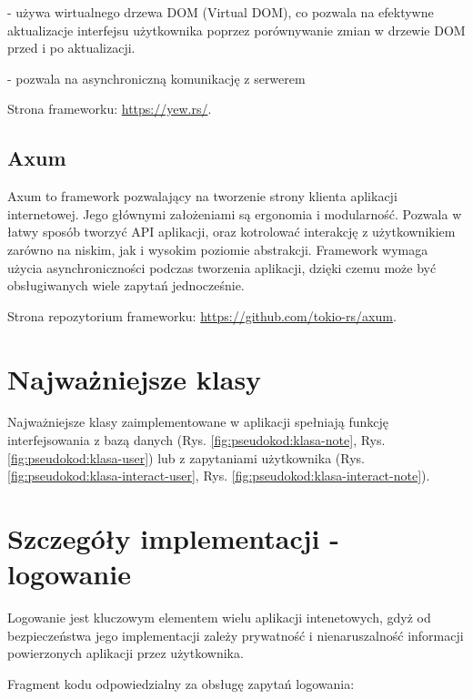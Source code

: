 \documentclass[a4paper,twoside,12pt]{book}
\begin{document}
- używa wirtualnego drzewa DOM (Virtual DOM), co pozwala na efektywne aktualizacje interfejsu użytkownika poprzez porównywanie zmian w drzewie DOM przed i po aktualizacji.

- pozwala na asynchroniczną komunikację z serwerem

Strona frameworku: \url{https://yew.rs/}.

\subsection{Axum}

Axum to framework pozwalający na tworzenie strony klienta aplikacji internetowej.
Jego głównymi założeniami są ergonomia i modularność. Pozwala w łatwy sposób 
tworzyć API aplikacji, oraz kotrolować interakcję z użytkownikiem zarówno na niskim,
jak i wysokim poziomie abstrakcji. Framework wymaga użycia asynchroniczności podczas
tworzenia aplikacji, dzięki czemu może być obsługiwanych wiele zapytań jednocześnie.

Strona repozytorium frameworku: \url{https://github.com/tokio-rs/axum}.

\section{Najważniejsze klasy}

Najważniejsze klasy zaimplementowane w aplikacji spełniają funkcję interfejsowania
z bazą danych (Rys. \ref{fig:pseudokod:klasa-note}, Rys. \ref{fig:pseudokod:klasa-user}) lub z zapytaniami użytkownika (Rys. \ref{fig:pseudokod:klasa-interact-user}, Rys. \ref{fig:pseudokod:klasa-interact-note}).


\section{Szczegóły implementacji - logowanie}

Logowanie jest kluczowym elementem wielu aplikacji intenetowych,
gdyż od bezpieczeństwa jego implementacji zależy prywatność i nienaruszalność
informacji powierzonych aplikacji przez użytkownika.

Fragment kodu odpowiedzialny za obsługę zapytań logowania:
\end{document}
